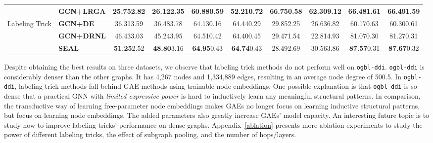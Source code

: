 \documentclass{article}
\begin{document}
\begin{table*}[t]
\begin{center}
{\begin{tabular}{llcccccccc}
    &\textbf{GCN+LRGA} & 25.75{\small2.82} &  26.12{\small2.35} & 60.88{\small0.59} & 52.21{\small0.72} & \cellcolor[HTML]{B7FFFA}\textbf{66.75}{\small0.58} & \cellcolor[HTML]{B7FFFA}\textbf{62.30}{\small9.12} & 66.48{\small1.61} & 66.49{\small1.59} \\
    \midrule
    \multirow{3}{*}{Labeling Trick} 
&\textbf{GCN+DE} & \cellcolor[HTML]{E7FFFD}36.31{\small3.59} &  \cellcolor[HTML]{E7FFFD}36.48{\small3.78} & \cellcolor[HTML]{E7FFFD}64.13{\small0.16} & \cellcolor[HTML]{D2FFFC}64.44{\small0.29} & 29.85{\small2.25} &  26.63{\small6.82} & 60.17{\small0.63} & 60.30{\small0.61} \\
    &\textbf{GCN+DRNL} & \cellcolor[HTML]{D2FFFC}46.43{\small3.03} &  \cellcolor[HTML]{D2FFFC}45.24{\small3.95} & \cellcolor[HTML]{D2FFFC}64.51{\small0.42} & \cellcolor[HTML]{E7FFFD}64.40{\small0.45} & 29.47{\small1.54} &  22.81{\small4.93} & 81.07{\small0.30} & 81.27{\small0.31} \\
    &\textbf{SEAL} & \cellcolor[HTML]{B7FFFA}\textbf{51.25}{\small2.52} &  \cellcolor[HTML]{B7FFFA}\textbf{48.80}{\small3.16} & \cellcolor[HTML]{B7FFFA}\textbf{64.95}{\small0.43} & \cellcolor[HTML]{B7FFFA}\textbf{64.74}{\small0.43} & 28.49{\small2.69} &  30.56{\small3.86} & \cellcolor[HTML]{B7FFFA}\textbf{87.57}{\small0.31} & \cellcolor[HTML]{B7FFFA}\textbf{87.67}{\small0.32} \\
  \bottomrule
\end{tabular}
}
\end{center}
\end{table*}





Despite obtaining the best results on three datasets, we observe that labeling trick methods do not perform well on \texttt{ogbl-ddi}. \texttt{ogbl-ddi} is considerably denser than the other graphs. It has 4,267 nodes and 1,334,889 edges, resulting in an average node degree of 500.5. In \texttt{ogbl-ddi}, labeling trick methods fall behind GAE methods using trainable node embeddings. One possible explanation is that \texttt{ogbl-ddi} is so dense that a practical GNN with \textit{limited expressive power} is hard to inductively learn any meaningful structural patterns. In comparison, the transductive way of learning free-parameter node embeddings makes GAEs no longer focus on learning inductive structural patterns, but focus on learning node embeddings. The added parameters also greatly increase GAEs' model capacity.
An interesting future topic is to study how to improve labeling tricks' performance on dense graphs.
Appendix~\ref{ablation} presents more ablation experiments to study the power of different labeling tricks, the effect of subgraph pooling, and the number of hops/layers.
\end{document}
